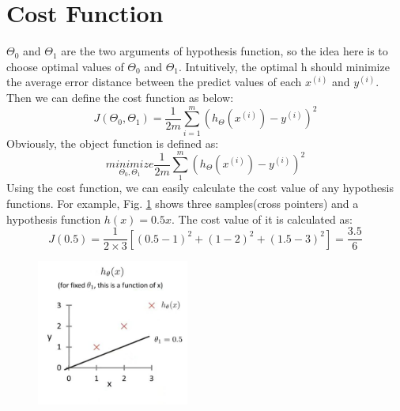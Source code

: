 \documentclass{article}
\begin{document}
\section{Cost Function}
$\Theta_0$ and $\Theta_1$ are the two arguments of hypothesis function, so the idea here is to choose optimal values of $\Theta_0$ and $\Theta_1$. Intuitively, the optimal h should minimize the average error distance between the predict values of each $x^{(i)}$ and $y^{(i)}$. Then we can define the cost function as below:
\begin{equation}\label{cost_function}
J(\Theta_0, \Theta_1) = \frac{1}{2m} \sum_{i=1}^{m} (h_\Theta({x^{(i)}})-y^{(i)})^2
\end{equation}
Obviously, the object function is defined as:
\begin{equation}\label{object_function}
\underset{\Theta_0, \Theta_1}{minimize} \frac{1}{2m} \sum_{1}^{m} (h_\Theta({x^{(i)}})-y^{(i)})^2
\end{equation}
Using the cost function, we can easily calculate the cost value of any hypothesis functions. For example, Fig. \ref{examples_hypothesis_plot} shows three samples(cross pointers) and a hypothesis function $h(x)=0.5x$. The cost value of it is calculated as:
\begin{equation}\label{cost_function_example}
J(0.5)=\frac{1}{2 \times 3}[(0.5-1)^2 + (1-2)^2 + (1.5-3)^2]=\frac {3.5}{6}
\end{equation}
\begin{figure}[ht]
  \centering
  \includegraphics[width=5cm]{Figure1.jpg}\\
  \caption{}\label{examples_hypothesis_plot}
\end{figure}
\end{document}

